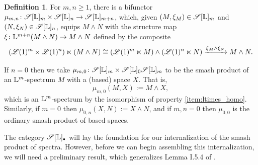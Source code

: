 \documentclass[openany, amssymb, psamsfonts]{amsart}
\theoremstyle{definition}
\newtheorem{defn}{Definition}[section]
\numberwithin{equation}{section}
\begin{document}
\begin{defn}
    For $m, n \geq 1$, there is a bifunctor $\mu_{m, n} \colon \mathscr{S}[\mathbb{L}]_m \times \mathscr{S}[\mathbb{L}]_n \to \mathscr{S}[\mathbb{L}]_{m + n}$, which, given $(M, \xi_M) \in \mathscr{S}[\mathbb{L}]_m$ and $(N, \xi_N) \in \mathscr{S}[\mathbb{L}]_n$, equips $M \wedge N$ with the structure map $\xi \colon \mathbb{L}^{m + n}(M \wedge N) \to M \wedge N$ defined by the composite
    \begin{equation*}
        (\mathscr{L}(1)^m \times \mathscr{L}(1)^n) \ltimes (M \wedge N) \cong (\mathscr{L}(1)^m \ltimes M) \wedge (\mathscr{L}(1)^n \ltimes N) \xrightarrow{\xi_M \wedge \xi_N} M \wedge N.
    \end{equation*} 

    If $n = 0$ then we take $\mu_{m, 0} \colon \mathscr{S}[\mathbb{L}]_m \times \mathscr{S}[\mathbb{L}]_0 \mathscr{S}[\mathbb{L}]_m$ to be the smash product of an $\mathbb{L}^m$-spectrum $M$ with a (based) space $X$. That is,
    $$
        \mu_{m, 0}(M, X) := M \wedge X,
    $$
    which is an $\mathbb{L}^m$-spectrum by the isomorphism of property \ref{item:ltimes_homo}. Similarly, if $m = 0$ then $\mu_{0, n}(X, N) := X \wedge N$, and if $m, n = 0$ then $\mu_{0, 0}$ is the ordinary smash product of based spaces.
\end{defn}

The category $\scS[\LL]_\sbull$ will lay the foundation for our internalization of the smash product of spectra. However, before we can begin assembling this internalization, we will need a preliminary result, which generalizes Lemma I.5.4 of \cite{EKMM}.
\end{document}

